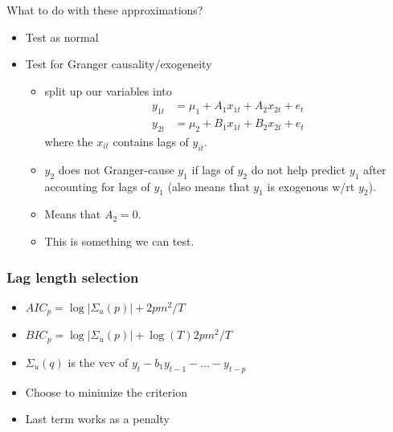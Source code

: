 What to do with these approximations?
\begin{itemize}
\item Test as normal
\item Test for Granger causality/exogeneity
  \begin{itemize}
  \item split up our variables into
    \begin{align*}
      y_{1t} &= \mu_1 + A_1 x_{1t} + A_2 x_{2t} + e_t \\
      y_{2t} &= \mu_2 + B_1 x_{1t} + B_2 x_{2t} + e_t
    \end{align*}
    where the $x_{it}$ contains lags of $y_{it}$.
  \item $y_2$ does not Granger-cause $y_1$ if lags of $y_2$ do not
    help predict $y_1$ after accounting for lags of $y_1$ (also means
    that $y_1$ is exogenous w/rt $y_2$).
  \item Means that $A_2 = 0$.
  \item This is something we can test.
  \end{itemize}
\end{itemize}

\subsubsection{Lag length selection}

\begin{itemize}
\item $AIC_p = \log | \Sigma_u(p)| + 2 p m^2 / T$
\item $BIC_p = \log | \Sigma_u(p)| + \log(T) 2 p m^2 / T$
\item $\Sigma_u(q)$ is the vcv of $y_t - b_1 y_{t-1} - \dots - y_{t-p}$
\item Choose to minimize the criterion
\item Last term works as a penalty
\end{itemize}

